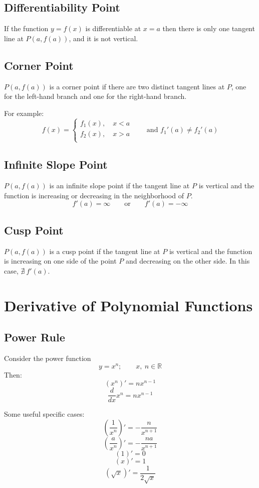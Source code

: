 		\subsection{Differentiability Point}
			If the function $y=f(x)$ is differentiable at $x=a$ then there is only one tangent line at $P(a, f(a))$, and it is not vertical.
		\subsection{Corner Point}
			$P(a, f(a))$ is a corner point if there are two distinct tangent lines at $P$, one for the left-hand branch and one for the right-hand branch.
			
			For example:
			\\
			\begin{equation*}
				f(x)=
				\begin{cases}
					f_1(x), \quad x < a\\
					f_2(x), \quad x > a\\
				\end{cases}
				\qquad\text{and } f_1'(a) \neq f_2'(a)
			\end{equation*}
		\subsection{Infinite Slope Point}
			$P(a, f(a))$ is an infinite slope point if the tangent line at $P$ is vertical and the function is increasing or decreasing in the neighborhood of $P$.
			\[f'(a) = \infty \qquad \text{or} \qquad f'(a) = -\infty\]
		\subsection{Cusp Point}
			$P(a,f(a))$ is a cusp point if the tangent line at $P$ is vertical and the function is increasing on one side of the point $P$ and decreasing on the other side. In this case, $\nexists\ f'(a)$.
	\section{Derivative of Polynomial Functions}
		\subsection{Power Rule}
			Consider the power function
			\[y=x^n;\qquad x,\ n \in \mathbb{R}\]
			Then:
			\[(x^n)' = nx^{n-1}\]
			\[\frac{d}{dx}x^n = nx^{n-1}\]
			
			Some useful specific cases:
			\[\left(\frac{1}{x^n}\right)' = -\frac{n}{x^{n+1}}\]
			\[\left(\frac{a}{x^n}\right)' = -\frac{na}{x^{n+1}}\]
			\[(1)'=0\]
			\[(x)'=1\]
			\[(\sqrt{x})'=\frac{1}{2\sqrt{x}}\]
